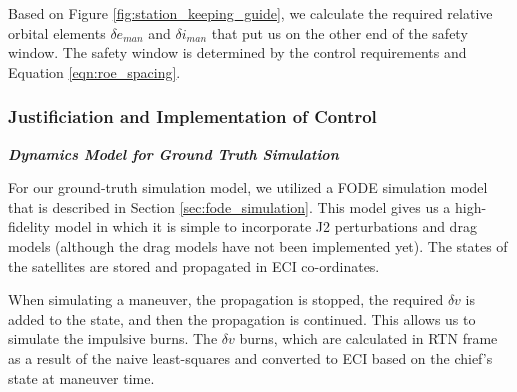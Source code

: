 Based on Figure \ref{fig:station_keeping_guide}, we calculate the required relative orbital elements $\delta e_{man}$ and $\delta i_{man}$ that put us on the other end of the safety window. The safety window is determined by the control requirements and Equation \ref{eqn:roe_spacing}.

\subsubsection{Justificiation and Implementation of Control}

\textbf{\textit{Dynamics Model for Ground Truth Simulation}}

For our ground-truth simulation model, we utilized a FODE simulation model that is described in Section \ref{sec:fode_simulation}. This model gives us a high-fidelity model in which it is simple to incorporate J2 perturbations and drag models (although the drag models have not been implemented yet). The states of the satellites are stored and propagated in ECI co-ordinates. 

When simulating a maneuver, the propagation is stopped, the required $\delta v$ is added to the state, and then the propagation is continued. This allows us to simulate the impulsive burns. The $\delta v$ burns, which are calculated in RTN frame as a result of the naive least-squares and converted to ECI based on the chief's state at maneuver time.






